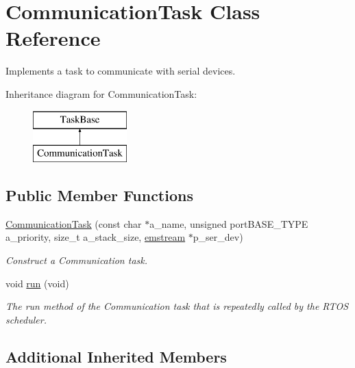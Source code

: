 \hypertarget{class_communication_task}{}\section{Communication\+Task Class Reference}
\label{class_communication_task}


Implements a task to communicate with serial devices.  


Inheritance diagram for Communication\+Task\+:\begin{figure}[H]
\begin{center}
\leavevmode
\includegraphics[height=2.000000cm]{class_communication_task}
\end{center}
\end{figure}
\subsection*{Public Member Functions}
\begin{DoxyCompactItemize}
\item 
\mbox{\hyperlink{class_communication_task_ac76f495e2350156d1faaa1a3198fe80f}{Communication\+Task}} (const char $\ast$a\+\_\+name, unsigned port\+B\+A\+S\+E\+\_\+\+T\+Y\+PE a\+\_\+priority, size\+\_\+t a\+\_\+stack\+\_\+size, \mbox{\hyperlink{classemstream}{emstream}} $\ast$p\+\_\+ser\+\_\+dev)
\begin{DoxyCompactList}\small\item\em Construct a Communication task. \end{DoxyCompactList}\item 
void \mbox{\hyperlink{class_communication_task_a33c23712d6b6952d3e7fb180bab34a83}{run}} (void)
\begin{DoxyCompactList}\small\item\em The run method of the Communication task that is repeatedly called by the R\+T\+OS scheduler. \end{DoxyCompactList}\end{DoxyCompactItemize}
\subsection*{Additional Inherited Members}


